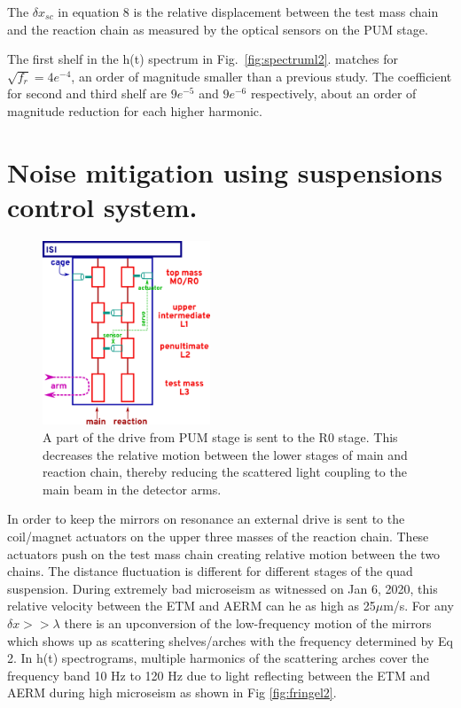 \documentclass[12pt]{iopart}
\begin{document}
The $\delta x_{sc} $ in equation 8 is the relative displacement between the test mass chain and the reaction chain as measured by the optical sensors on the PUM stage. 

The first shelf in the h(t) spectrum in Fig.~\ref{fig:spectruml2}. matches for $\sqrt{f_{r}} = 4e^{-4}$, an order of magnitude smaller than a previous study\cite{hiro_calc}. The coefficient for second and third shelf are $9e^{-5}$ and $9e^{-6}$ respectively, about an order of magnitude reduction for each higher harmonic.

\qquad



\section{Noise mitigation using suspensions control system.} \label{rzero}
\quad
\begin{figure}[h]
    \centering
    \includegraphics[width=5cm]{R0trackingdiagram.png}
    \caption{A part of the drive from PUM stage is sent to the R0 stage. This decreases the relative motion between the lower stages of main and reaction chain, thereby reducing the scattered light coupling to the main beam in the detector arms.}
    \label{fig:r0tracking}
\end{figure}
In order to keep the mirrors on resonance an external drive is sent to the coil/magnet actuators on the upper three masses of the reaction chain. These actuators push on the test mass chain creating relative motion between the two chains. The distance fluctuation is different for different stages of the quad suspension. 
During extremely bad microseism as witnessed on Jan 6, 2020, this relative velocity between the ETM and AERM can he as high as 25${\mu}$m/s. For any ${\delta}x >> {\lambda}$ there is an upconversion of the low-frequency motion of the mirrors which shows up as scattering shelves/arches with the frequency determined by Eq 2. In h(t) spectrograms, multiple harmonics of the scattering arches cover the frequency band 10 Hz to 120 Hz due to light reflecting between the ETM and AERM during high microseism as shown in Fig \ref{fig:fringel2}.
\end{document}
